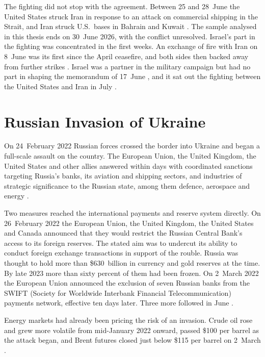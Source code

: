 The fighting did not stop with the agreement. Between 25 and 28~June the United States struck Iran in response to an attack on commercial shipping in the Strait, and Iran struck U.S.\ bases in Bahrain and Kuwait \parencite{hoc_2026_ceasefire}. The sample analysed in this thesis ends on 30~June 2026, with the conflict unresolved. Israel's part in the fighting was concentrated in the first weeks. An exchange of fire with Iran on 8~June was its first since the April ceasefire, and both sides then backed away from further strikes \parencite{ap_2026_israel_iran}. Israel was a partner in the military campaign but had no part in shaping the memorandum of 17~June \parencite{inss_2026_mou}, and it sat out the fighting between the United States and Iran in July \parencite{toi_2026_sidelines}.

\section{Russian Invasion of Ukraine}
\label{sec:bg_ukraine}

On 24~February 2022 Russian forces crossed the border into Ukraine and began a full-scale assault on the country. The European Union, the United Kingdom, the United States and other allies answered within days with coordinated sanctions targeting Russia's banks, its aviation and shipping sectors, and industries of strategic significance to the Russian state, among them defence, aerospace and energy \parencite{hoc_2025_sanctions}.

Two measures reached the international payments and reserve system directly. On 26~February 2022 the European Union, the United Kingdom, the United States and Canada announced that they would restrict the Russian Central Bank's access to its foreign reserves. The stated aim was to undercut its ability to conduct foreign exchange transactions in support of the rouble. Russia was thought to hold more than \$630~billion in currency and gold reserves at the time. By late 2023 more than sixty percent of them had been frozen. On 2~March 2022 the European Union announced the exclusion of seven Russian banks from the SWIFT (Society for Worldwide Interbank Financial Telecommunication) payments network, effective ten days later. Three more followed in June \parencite{hoc_2025_sanctions}.

Energy markets had already been pricing the risk of an invasion. Crude oil rose and grew more volatile from mid-January 2022 onward, passed \$100 per barrel as the attack began, and Brent futures closed just below \$115 per barrel on 2~March \parencite{eia_2022_ukraine}.

